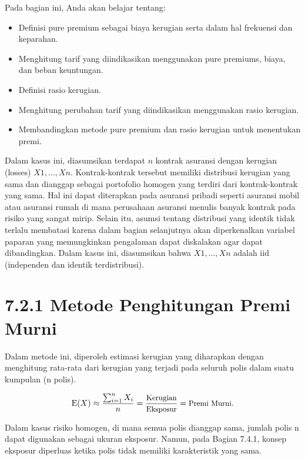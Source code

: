 \documentclass[
]{book}
\providecommand{\tightlist}{%
  \setlength{\itemsep}{0pt}\setlength{\parskip}{0pt}}
\begin{document}
Pada bagian ini, Anda akan belajar tentang:

\begin{itemize}
\tightlist
\item
  Definisi pure premium sebagai biaya kerugian serta dalam hal frekuensi dan keparahan.
\item
  Menghitung tarif yang diindikasikan menggunakan pure premiums, biaya, dan beban keuntungan.
\item
  Definisi rasio kerugian.
\item
  Menghitung perubahan tarif yang diindikasikan menggunakan rasio kerugian.
\item
  Membandingkan metode pure premium dan rasio kerugian untuk menentukan premi.
\end{itemize}

Dalam kasus ini, diasumsikan terdapat \(n\) kontrak asuransi dengan kerugian (losses) \(X1,...,Xn\). Kontrak-kontrak tersebut memiliki distribusi kerugian yang sama dan dianggap sebagai portofolio homogen yang terdiri dari kontrak-kontrak yang sama. Hal ini dapat diterapkan pada asuransi pribadi seperti asuransi mobil atau asuransi rumah di mana perusahaan asuransi menulis banyak kontrak pada risiko yang sangat mirip. Selain itu, asumsi tentang distribusi yang identik tidak terlalu membatasi karena dalam bagian selanjutnya akan diperkenalkan variabel paparan yang memungkinkan pengalaman dapat diskalakan agar dapat dibandingkan. Dalam kasus ini, diasumsikan bahwa \(X1,...,Xn\) adalah iid (independen dan identik terdistribusi).

\hypertarget{metode-penghitungan-premi-murni}{%
\section{7.2.1 Metode Penghitungan Premi Murni}\label{metode-penghitungan-premi-murni}}

Dalam metode ini, diperoleh estimasi kerugian yang diharapkan dengan menghitung rata-rata dari kerugian yang terjadi pada seluruh polis dalam suatu kumpulan (n polis).

\begin{equation}
\small{
\mathrm{E}(X) \approx \frac{\sum_{i=1}^n X_i}{n} = \frac{\text{Kerugian}}{\text{Eksposur}} = \text{Premi Murni}.
}
\end{equation}

Dalam kasus risiko homogen, di mana semua polis dianggap sama, jumlah polis n dapat digunakan sebagai ukuran eksposur. Namun, pada Bagian 7.4.1, konsep eksposur diperluas ketika polis tidak memiliki karakteristik yang sama.
\end{document}

